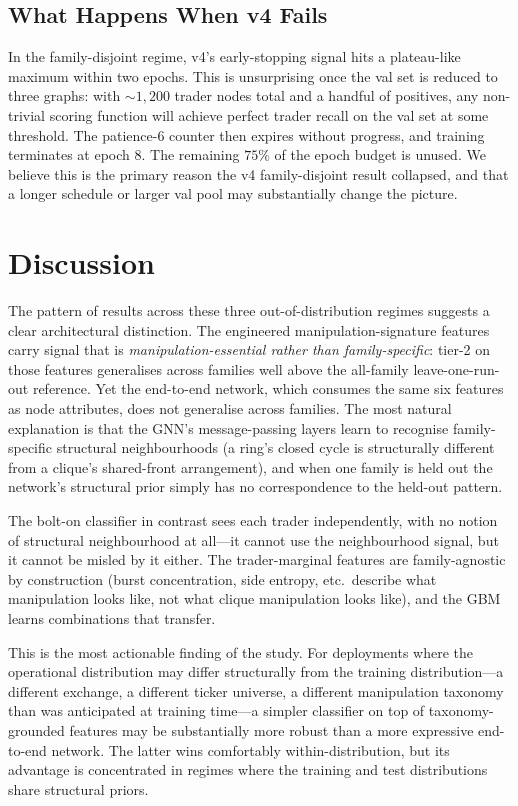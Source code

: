 \documentclass[10pt,twocolumn,letterpaper]{article}
\begin{document}
\subsection{What Happens When v4 Fails}
\label{sec:fail}
In the family-disjoint regime, v4's early-stopping signal hits a
plateau-like maximum within two epochs. This is unsurprising once the
val set is reduced to three graphs: with \(\sim\!1{,}200\) trader nodes
total and a handful of positives, any non-trivial scoring function will
achieve perfect trader recall on the val set at some threshold. The
patience-\(6\) counter then expires without progress, and training
terminates at epoch \(8\). The remaining \(75\%\) of the epoch budget
is unused. We believe this is the primary reason the v4 family-disjoint
result collapsed, and that a longer schedule or larger val pool may
substantially change the picture.

\section{Discussion}
\label{sec:disc}

The pattern of results across these three out-of-distribution regimes
suggests a clear architectural distinction. The engineered
manipulation-signature features carry signal that is
\emph{manipulation-essential rather than family-specific}: tier-2 on
those features generalises across families well above the
all-family leave-one-run-out reference. Yet the end-to-end network,
which consumes the same six features as node attributes, does not
generalise across families. The most natural explanation is that the
GNN's message-passing layers learn to recognise family-specific
structural neighbourhoods (a ring's closed cycle is structurally
different from a clique's shared-front arrangement), and when one
family is held out the network's structural prior simply has no
correspondence to the held-out pattern.

The bolt-on classifier in contrast sees each trader independently, with
no notion of structural neighbourhood at all---it cannot use the
neighbourhood signal, but it cannot be misled by it either. The
trader-marginal features are family-agnostic by construction
(burst concentration, side entropy, etc.\ describe what manipulation
looks like, not what clique manipulation looks like), and the GBM
learns combinations that transfer.

This is the most actionable finding of the study. For deployments
where the operational distribution may differ structurally from the
training distribution---a different exchange, a different ticker
universe, a different manipulation taxonomy than was anticipated at
training time---a simpler classifier on top of taxonomy-grounded
features may be substantially more robust than a more expressive
end-to-end network. The latter wins comfortably within-distribution,
but its advantage is concentrated in regimes where the training and
test distributions share structural priors.
\end{document}
